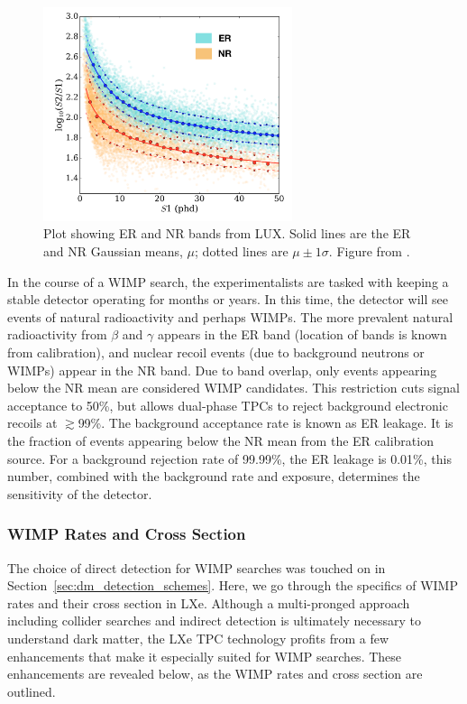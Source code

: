 \begin{figure}[htbp]
\begin{center}
\includegraphics[width=0.65\textwidth]{figures/lxetpcs/bands.png}
\caption{Plot showing \acs{ER} and \acs{NR} bands from \acs{LUX}. Solid lines are the \acs{ER} and \acs{NR} Gaussian means, $\mu$; dotted lines are $\mu \pm 1 \sigma$. Figure from \cite{LUX:YieldsAndRecombination}. }
\label{fig:bands}
\end{center}
\end{figure}


In the course of a \ac{WIMP} search, the experimentalists are tasked with keeping a stable detector operating for months or years. In this time, the detector will see events of natural radioactivity and perhaps \ac{WIMP}s. The more prevalent natural radioactivity from $\beta$ and $\gamma$ appears in the \ac{ER} band (location of bands is known from calibration), and nuclear recoil events (due to background neutrons or \ac{WIMP}s) appear in the \ac{NR} band. Due to band overlap, only events appearing below the \ac{NR} mean are considered \ac{WIMP} candidates. This restriction cuts signal acceptance to 50\%, but allows dual-phase \ac{TPC}s to reject background electronic recoils at $\gtrsim$99\%. The background acceptance rate is known as \ac{ER} leakage. It is the fraction of events appearing below the \ac{NR} mean from the \ac{ER} calibration source. For a background rejection rate of 99.99\%, the \ac{ER} leakage is 0.01\%, this number, combined with the background rate and exposure, determines the sensitivity of the detector.


\subsubsection{WIMP Rates and Cross Section}
\label{sec:wimp_rates}
The choice of direct detection for \ac{WIMP} searches was touched on in Section~\ref{sec:dm_detection_schemes}. Here, we go through the specifics of \ac{WIMP} rates and their cross section in \ac{LXe}. Although a multi-pronged approach including collider searches and indirect detection is ultimately necessary to understand dark matter, the \ac{LXe} \ac{TPC} technology profits from a few enhancements that make it especially suited for \ac{WIMP} searches. These enhancements are revealed below, as the \ac{WIMP} rates and cross section are outlined. 

